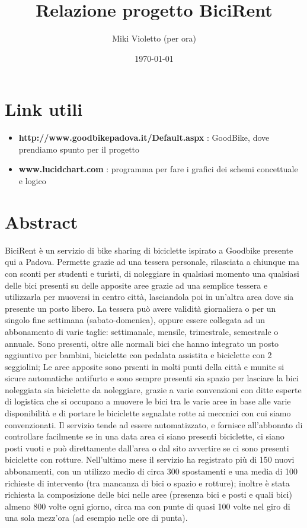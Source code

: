 \documentclass[1 pt,a4paper,twoside]{article}
\author{Miki Violetto (per ora)}
\title{Relazione progetto BiciRent}
\date{\today}
\begin{document}
\maketitle

\newpage
\tableofcontents

\newpage
\section{Link utili}
\begin{itemize}
\item \textbf{http://www.goodbikepadova.it/Default.aspx} : GoodBike, dove 
prendiamo spunto per il progetto
\item \textbf{www.lucidchart.com} : programma per fare i grafici dei schemi 
concettuale e logico
\end{itemize}

\section{Abstract}
BiciRent è un servizio di bike sharing di biciclette ispirato a Goodbike presente qui a Padova.
Permette grazie ad una tessera personale, rilasciata a chiunque ma con sconti per studenti e turisti, di noleggiare in qualsiasi momento una qualsiasi delle bici presenti su delle apposite aree grazie ad una semplice tessera e utilizzarla per muoversi in centro città, lasciandola poi in un'altra area dove sia presente un posto libero. 
La tessera può avere validità giornaliera o per un singolo fine settimana (sabato-domenica), oppure essere collegata ad un abbonamento di varie taglie: settimanale, mensile, trimestrale, semestrale o  annuale.
Sono presenti, oltre alle normali bici che hanno integrato un posto aggiuntivo per bambini, biciclette con pedalata assistita e biciclette con 2 seggiolini;
Le aree apposite sono prsenti in molti punti della città e munite si sicure automatiche antifurto e sono sempre presenti sia spazio per lasciare la bici noleggiata sia biciclette da noleggiare, grazie a varie convenzioni con ditte esperte di logistica che si occupano a muovere le bici tra le varie aree in base alle varie disponibilità e di portare le biciclette segnalate rotte ai meccnici con cui siamo convenzionati.
Il servizio tende ad essere automatizzato, e fornisce all'abbonato di controllare facilmente se in una data area ci siano presenti biciclette, ci siano posti vuoti e può direttamente dall'area o dal sito avvertire se ci sono presenti biciclette con rotture.
Nell'ultimo mese il servizio ha registrato più di 150 nuovi abbonamenti, con un utilizzo medio di circa 300 spostamenti e una media di 100 richieste di intervento (tra mancanza di bici o spazio e rotture); 
inoltre è stata richiesta la composizione delle bici nelle aree (presenza bici e posti e quali bici) almeno 800 volte ogni giorno, circa ma con punte di quasi 100 volte nel giro di una sola mezz'ora (ad esempio nelle ore di punta).
\end{document}
